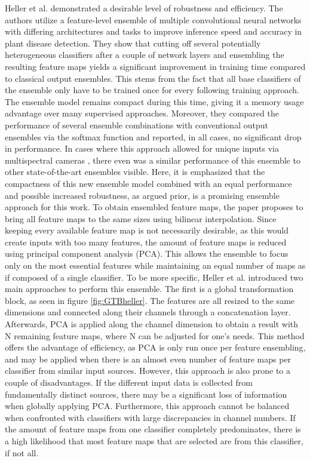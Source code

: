 Heller et al. \cite{EnsembleHeller2023} demonstrated a desirable level of robustness and efficiency. The authors utilize a feature-level ensemble of multiple 
convolutional neural networks with differing architectures and tasks to improve inference speed and accuracy in plant disease detection.
They show that cutting off several potentially heterogeneous classifiers after a couple of network layers and ensembling the 
resulting feature maps yields a significant improvement in training time compared to classical output ensembles. This stems from 
the fact that all base classifiers of the ensemble only have to be trained once for every following training approach. The ensemble 
model remains compact during this time, giving it a memory usage advantage over many supervised approaches. 
Moreover, they compared the performance of several ensemble combinations with conventional 
output ensembles via the softmax function and reported, in all cases, no significant drop in performance. In cases where this approach allowed for 
unique inputs via multispectral cameras \cite{EnsembleHeller2023}, there even was a similar performance of this ensemble to other state-of-the-art ensembles visible. Here, it is emphasized that the compactness of this new ensemble model combined with an equal performance and possible 
increased robustness, as argued prior, is a promising ensemble approach for this work.\newline
To obtain ensembled feature maps, the paper proposes to bring all feature maps to the same sizes using bilinear interpolation. Since 
keeping every available feature map is not necessarily desirable, as this would create inputs with too many features, the amount of feature 
maps is reduced using principal component analysis (PCA). This allows the ensemble to focus only on the most essential features while maintaining 
an equal number of maps as if composed of a single classifier. To be more specific, Heller et al. \cite{EnsembleHeller2023} introduced two main 
approaches to perform this ensemble. The first is a global transformation block, as seen in figure \ref{fig:GTBheller}. 
The features are all resized to the same dimensions and connected along their channels through a concatenation layer.
Afterwards, PCA is applied along the channel dimension to obtain a result with N remaining feature maps, where N can be adjusted for one's 
needs. This method offers the advantage of efficiency, as PCA is only run once per feature ensembling, and may be applied when there is 
an almost even number of feature maps per classifier from similar input sources. However, this approach is also 
prone to a couple of disadvantages. If the different input data is collected from fundamentally distinct sources, there may be a significant 
loss of information when globally applying PCA. Furthermore, this approach cannot be balanced when confronted with classifiers with large 
discrepancies in channel numbers. If the amount of feature maps from one classifier completely predominates, there is a high likelihood 
that most feature maps that are selected are from this classifier, if not all.

